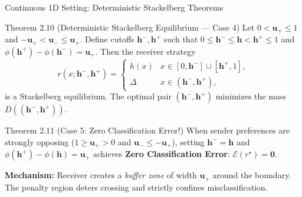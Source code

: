 \documentclass[aspectratio=169, 11pt, t, xcolor=table]{beamer}
\newcommand{\cg}[1]{\mathcal{#1}}
\newcommand{\hh}{\mathbf{h}}
\newcommand{\um}{\mathbf{u_-}}
\newcommand{\up}{\mathbf{u_+}}
\newcommand{\hminus}{\mathbf{h^{-}}}
\newcommand{\hplus}{\mathbf{h^{+}}}
\newcommand{\rs}{r^{\star}}
\begin{document}
\begin{frame}{Continuous 1D Setting: Deterministic Stackelberg Theorems}
\small
\begin{block}{Theorem 2.10 (Deterministic Stackelberg Equilibrium — Case 4)}
\footnotesize
Let $0 < \up \le 1$ and $-\up < \um \le \up$. Define cutoffs $\hminus, \hplus$ such that $0 \le \hminus \le \hh < \hplus \le 1$ and $\phi(\hplus) - \phi(\hminus) = \up$. Then the receiver strategy
\[
  r(x;\hminus,\hplus) = \begin{cases}
    h(x) & x \in [0,\hminus] \cup [\hplus, 1], \\
    \Delta & x \in (\hminus, \hplus),
  \end{cases}
\]
is a Stackelberg equilibrium. The optimal pair $(\hminus,\hplus)$ minimizes the mass $D((\hminus,\hplus))$.
\end{block}

\par\vspace{0.2em}
\begin{block}{Theorem 2.11 (Case 5: Zero Classification Error!)}
\footnotesize
When sender preferences are strongly opposing ($1 \ge \up > 0$ and $\um \le -\up$), setting $\hminus = \hh$ and $\phi(\hplus) - \phi(\hh) = \up$ achieves \textbf{Zero Classification Error}:
$\cg{E}(\rs) = \mathbf{0}$.
\end{block}

\par\vspace{0.2em}
\footnotesize
\textbf{Mechanism:} Receiver creates a \emph{buffer zone} of width $\up$ around the boundary. The penalty region deters crossing and strictly confines misclassification.
\end{frame}
\end{document}
